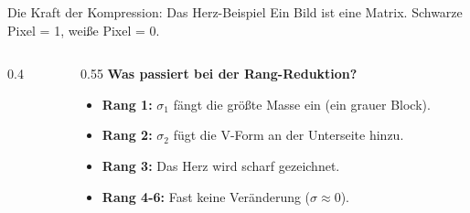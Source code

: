 \documentclass[10pt, aspectratio=169]{beamer}
\newcommand{\heartpixel}[2]{\fill[dunkel] (#1,#2) rectangle ++(1,-1);}
\begin{document}
\begin{frame}{Die Kraft der Kompression: Das Herz-Beispiel}
    Ein Bild ist eine Matrix. Schwarze Pixel = 1, weiße Pixel = 0.
    \begin{columns}
        \begin{column}{0.4\textwidth}
            \begin{center}
            \end{center}
        \end{column}
        \begin{column}{0.55\textwidth}
            \textbf{Was passiert bei der Rang-Reduktion?}
            \begin{itemize}[<+->]
                \item \textbf{Rang 1:} $\sigma_1$ fängt die größte Masse ein (ein grauer Block).
                \item \textbf{Rang 2:} $\sigma_2$ fügt die V-Form an der Unterseite hinzu.
                \item \textbf{Rang 3:} Das Herz wird scharf gezeichnet.
                \item \textbf{Rang 4-6:} Fast keine Veränderung ($\sigma \approx 0$).
            \end{itemize}
            \vspace{0.3cm}
        \end{column}
    \end{columns}
\end{frame}
\end{document}
